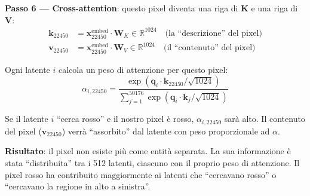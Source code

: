 \documentclass[12pt,a4paper]{article}
\begin{document}
\begin{examplebox}
\textbf{Passo 6 --- Cross-attention}: questo pixel diventa una riga di $\mathbf{K}$ e una riga di $\mathbf{V}$:
\begin{align*}
\mathbf{k}_{22450} &= \mathbf{x}_{22450}^{\text{embed}} \cdot \mathbf{W}_K \in \mathbb{R}^{1024} \quad \text{(la ``descrizione'' del pixel)} \\
\mathbf{v}_{22450} &= \mathbf{x}_{22450}^{\text{embed}} \cdot \mathbf{W}_V \in \mathbb{R}^{1024} \quad \text{(il ``contenuto'' del pixel)}
\end{align*}

Ogni latente $i$ calcola un peso di attenzione per questo pixel:
\[
\alpha_{i, 22450} = \frac{\exp(\mathbf{q}_i \cdot \mathbf{k}_{22450} / \sqrt{1024})}{\sum_{j=1}^{50176} \exp(\mathbf{q}_i \cdot \mathbf{k}_j / \sqrt{1024})}
\]

Se il latente $i$ ``cerca rosso'' e il nostro pixel \`e rosso, $\alpha_{i, 22450}$ sar\`a alto. Il contenuto del pixel ($\mathbf{v}_{22450}$) verr\`a ``assorbito'' dal latente con peso proporzionale ad $\alpha$.

\textbf{Risultato}: il pixel non esiste pi\`u come entit\`a separata. La sua informazione \`e stata ``distribuita'' tra i 512 latenti, ciascuno con il proprio peso di attenzione. Il pixel rosso ha contribuito maggiormente ai latenti che ``cercavano rosso'' o ``cercavano la regione in alto a sinistra''.
\end{examplebox}
\end{document}
